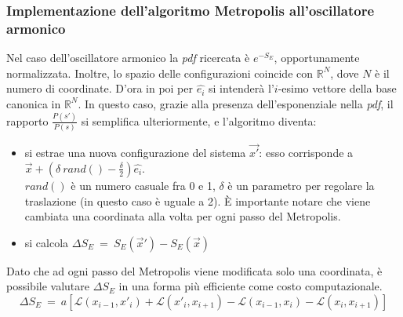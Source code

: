 \subsubsection{Implementazione dell'algoritmo Metropolis all'oscillatore armonico}
Nel caso dell'oscillatore armonico la \emph{pdf} ricercata è $ e^{-S_E}$, opportunamente normalizzata.
Inoltre, lo spazio delle configurazioni coincide con $\mathbb{R}^N$, dove $N$ è il numero di coordinate. D'ora in poi per $\hat{e_i}$ si intenderà l'$i$-esimo vettore
della base canonica in $\mathbb{R}^N$.
In questo caso, grazie alla presenza dell'esponenziale nella \emph{pdf},
il rapporto $ \frac{P(s')}{P(s)}$ si semplifica ulteriormente, e l'algoritmo diventa:
\begin{itemize}
 \item si estrae una nuova configurazione del sistema $\vec{x'}$: esso corrisponde a $\vec{x} + \left(\delta \ rand() - \frac{\delta}{2}\right)\hat{e_i}$.
  \\
  $rand()$ è un numero casuale fra 0 e 1, $\delta$ è un parametro per regolare la traslazione (in questo caso è uguale a 2).
  È importante notare che viene cambiata una coordinata alla volta per ogni passo del Metropolis.
 \item si calcola $\Delta S_E \ = \ S_E(\vec{x}') -S_E(\vec{x})$
\end{itemize}
Dato che ad ogni passo del Metropolis viene modificata solo una coordinata, è possibile valutare $\Delta S_E$ in una forma più efficiente come costo computazionale.
\begin{equation*}
\Delta S_E \ = \ a[\mathcal{L}(x_{i-1},x'_{i})+\mathcal{L}(x'_{i},x_{i+1})-\mathcal{L}(x_{i-1},x_{i})-\mathcal{L}(x_{i},x_{i+1})]    
\end{equation*}

